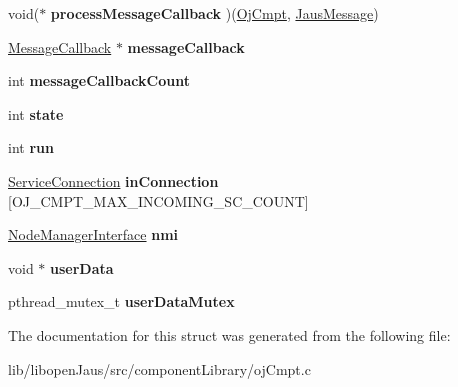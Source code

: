 \begin{DoxyCompactItemize}
\item 
\hypertarget{struct_oj_cmpt_struct_a8fb8be68941af717fbcb2f9c0e4703e8}{void($\ast$ {\bfseries process\-Message\-Callback} )(\hyperlink{struct_oj_cmpt_struct}{\-Oj\-Cmpt}, \hyperlink{struct_jaus_message_struct}{\-Jaus\-Message})}\label{struct_oj_cmpt_struct_a8fb8be68941af717fbcb2f9c0e4703e8}

\item 
\hypertarget{struct_oj_cmpt_struct_a499a9b5d854649e8faf14733292d5ef2}{\hyperlink{struct_message_callback}{\-Message\-Callback} $\ast$ {\bfseries message\-Callback}}\label{struct_oj_cmpt_struct_a499a9b5d854649e8faf14733292d5ef2}

\item 
\hypertarget{struct_oj_cmpt_struct_aa74ced6e080150a25a0eed28bcf79822}{int {\bfseries message\-Callback\-Count}}\label{struct_oj_cmpt_struct_aa74ced6e080150a25a0eed28bcf79822}

\item 
\hypertarget{struct_oj_cmpt_struct_a30b37bcecd7f9816bc7112e9519a6348}{int {\bfseries state}}\label{struct_oj_cmpt_struct_a30b37bcecd7f9816bc7112e9519a6348}

\item 
\hypertarget{struct_oj_cmpt_struct_a20df7eb12f08915d5a6a5f95f6ca35c3}{int {\bfseries run}}\label{struct_oj_cmpt_struct_a20df7eb12f08915d5a6a5f95f6ca35c3}

\item 
\hypertarget{struct_oj_cmpt_struct_a8cb672d5732f0d24e381d6be9e103e68}{\hyperlink{struct_service_connection_struct}{\-Service\-Connection} {\bfseries in\-Connection} \mbox{[}\-O\-J\-\_\-\-C\-M\-P\-T\-\_\-\-M\-A\-X\-\_\-\-I\-N\-C\-O\-M\-I\-N\-G\-\_\-\-S\-C\-\_\-\-C\-O\-U\-N\-T\mbox{]}}\label{struct_oj_cmpt_struct_a8cb672d5732f0d24e381d6be9e103e68}

\item 
\hypertarget{struct_oj_cmpt_struct_a3a367932f26644746e21f290f27d0ed0}{\hyperlink{struct_node_manager_interface_struct}{\-Node\-Manager\-Interface} {\bfseries nmi}}\label{struct_oj_cmpt_struct_a3a367932f26644746e21f290f27d0ed0}

\item 
\hypertarget{struct_oj_cmpt_struct_a01883ce0576987924991929b10ef7444}{void $\ast$ {\bfseries user\-Data}}\label{struct_oj_cmpt_struct_a01883ce0576987924991929b10ef7444}

\item 
\hypertarget{struct_oj_cmpt_struct_aad69cfc23cf2ce2cddc592c0370bcfe3}{pthread\-\_\-mutex\-\_\-t {\bfseries user\-Data\-Mutex}}\label{struct_oj_cmpt_struct_aad69cfc23cf2ce2cddc592c0370bcfe3}

\end{DoxyCompactItemize}


\-The documentation for this struct was generated from the following file\-:\begin{DoxyCompactItemize}
\item 
lib/libopen\-Jaus/src/component\-Library/oj\-Cmpt.\-c\end{DoxyCompactItemize}
